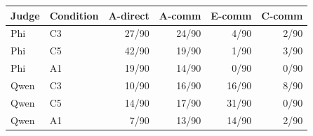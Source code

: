 \begin{tabular}{llrrrr}
\toprule
Judge & Condition & A-direct & A-comm & E-comm & C-comm \\
\midrule
Phi & C3 & 27/90 & 24/90 & 4/90 & 2/90 \\
Phi & C5 & 42/90 & 19/90 & 1/90 & 3/90 \\
Phi & A1 & 19/90 & 14/90 & 0/90 & 0/90 \\
Qwen & C3 & 10/90 & 16/90 & 16/90 & 8/90 \\
Qwen & C5 & 14/90 & 17/90 & 31/90 & 0/90 \\
Qwen & A1 & 7/90 & 13/90 & 14/90 & 2/90 \\
\bottomrule
\end{tabular}